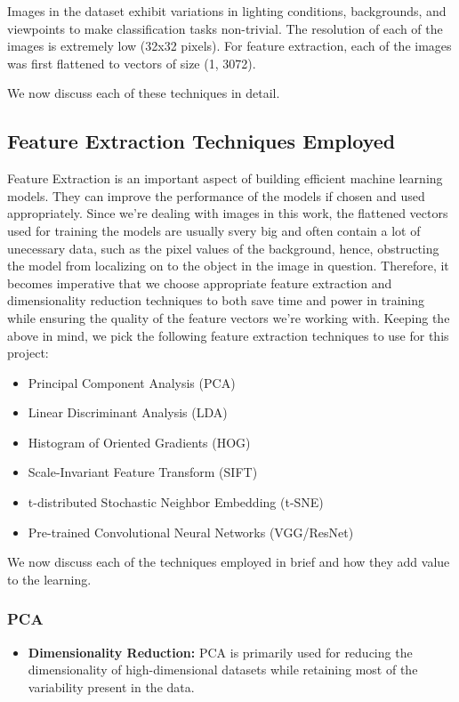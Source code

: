 \documentclass[a4paper]{article}
\theoremstyle{plain}
\theoremstyle{definition}
\begin{document}
{\noindent \newline Images in the dataset exhibit variations in lighting conditions, backgrounds, and viewpoints to make classification tasks non-trivial. 
The resolution of each of the images is extremely low (32x32 pixels). 
For feature extraction, each of the images was first flattened to vectors of size (1, 3072). 




We now discuss each of these techniques in detail.

\subsection {Feature Extraction Techniques Employed}

\noindent Feature Extraction is an important aspect of building efficient machine learning models. They can improve the performance of the models if chosen and used appropriately. Since we're dealing with images in this work, the flattened vectors used for training the models are usually svery big and often contain a lot of unecessary data, such as the pixel values of the background, hence, obstructing the model from localizing on to the object in the image in question. Therefore, it becomes imperative that we choose appropriate feature extraction and dimensionality reduction techniques to both save time and power in training while ensuring the quality of the feature vectors we're working with. Keeping the above in mind, we pick the following feature extraction techniques to use for this project: 

\begin{itemize}
  \item Principal Component Analysis (PCA)
  \item Linear Discriminant Analysis (LDA)
  \item Histogram of Oriented Gradients (HOG)
  \item Scale-Invariant Feature Transform (SIFT)
   \item t-distributed Stochastic Neighbor Embedding (t-SNE)
  \item Pre-trained Convolutional Neural Networks (VGG/ResNet)
\end{itemize}

\noindent We now discuss each of the techniques employed in brief and how they add value to the learning.

\subsubsection{PCA}
\begin{itemize}
    \item[] \textbf{Dimensionality Reduction:} PCA is primarily used for reducing the dimensionality of high-dimensional datasets while retaining most of the variability present in the data.
    

\end{itemize}}
\end{document}

